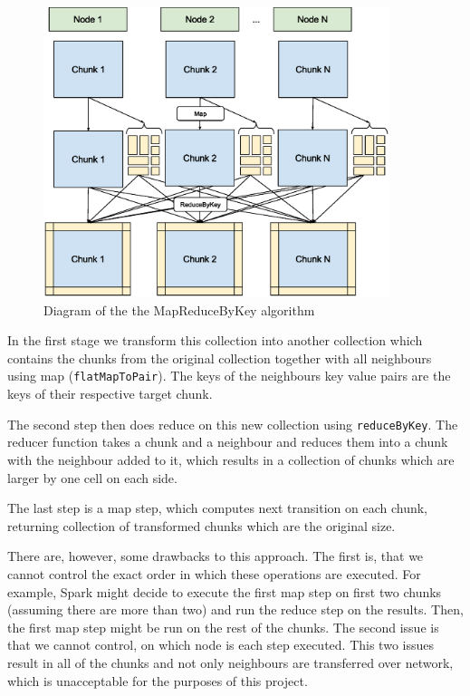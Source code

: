 \documentclass{l4proj}
\begin{document}
\begin{figure}
\centering
\includegraphics[width=0.9\textwidth]{images/MapReduce.eps}
\caption{Diagram of the the MapReduceByKey algorithm}
\label{fig:map_reduce}
\end{figure}

In the first stage we transform this collection into another collection which contains
the chunks from the original collection together with all neighbours using map
(\texttt{flatMapToPair}). The keys of the neighbours key value pairs are the keys of their respective
target chunk.

The second step then does reduce on this new collection using \texttt{reduceByKey}. 
The reducer function takes a chunk and a neighbour and reduces them into a chunk
with the neighbour added to it, which results in a collection of chunks which are
larger by one cell on each side.

The last step is a map step, which computes next transition on each chunk, returning
collection of transformed chunks which are the original size.

There are, however, some drawbacks to this approach. The first is, that we cannot
control the exact order in which these operations are executed. For example, Spark
might decide to execute the first map step on first two chunks (assuming there are more than two)
and run the reduce step on the results. Then, the first map step might be run on the rest
of the chunks. The second issue is that we cannot control, on which node is each step 
executed. This two issues result in all of the chunks and not only neighbours are
transferred over network, which is unacceptable for the purposes of this project.
\end{document}
